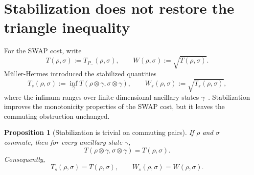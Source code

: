 \documentclass[11pt]{article}
\newtheorem{proposition}[theorem]{Proposition}
\begin{document}
\section{Stabilization does not restore the triangle inequality}
\label{sec:stabilization}

For the SWAP cost, write
\[
    T(\rho,\sigma):=T_{P_-}(\rho,\sigma),
    \qquad
    W(\rho,\sigma):=\sqrt{T(\rho,\sigma)}.
\]
M\"uller-Hermes introduced the stabilized quantities
\begin{equation}\label{eq:stabilized-cost}
    T_s(\rho,\sigma)
    :=\inf_{\gamma}T(\rho\otimes\gamma,\sigma\otimes\gamma),
    \qquad
    W_s(\rho,\sigma):=\sqrt{T_s(\rho,\sigma)},
\end{equation}
where the infimum ranges over finite-dimensional ancillary states
$\gamma$~\cite{Mul22}.  Stabilization improves the monotonicity properties
of the SWAP cost, but it leaves the commuting obstruction unchanged.

\begin{proposition}[Stabilization is trivial on commuting pairs]
\label{prop:stabilization-commuting-pairs}
    If $\rho$ and $\sigma$ commute, then for every ancillary state $\gamma$,
    \begin{equation}\label{eq:commuting-ancilla-invariance}
        T(\rho\otimes\gamma,\sigma\otimes\gamma)=T(\rho,\sigma).
    \end{equation}
    Consequently,
    \[
        T_s(\rho,\sigma)=T(\rho,\sigma),
        \qquad
        W_s(\rho,\sigma)=W(\rho,\sigma).
    \]
\end{proposition}
\end{document}
